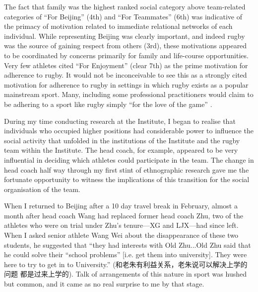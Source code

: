 \begin{CJK}{UTF8}{gbsn}
The fact that family was the highest ranked social category above team-related categories of ``For Beijing'' (4th) and ``For Teammates'' (6th) was indicative of the primacy of motivation related to immediate relational networks of each individual.  While representing Beijing was clearly important, and indeed rugby was the source of gaining respect from others (3rd), these motivations appeared to be coordinated by concerns primarily for family and life-course opportunities.  Very few athletes cited ``For Enjoyment'' (clear 7th) as the prime motivation for adherence to rugby.  It would not be inconceivable to see this as a strongly cited motivation for adherence to rugby in settings in which rugby exists as a popular mainstream sport.  Many, including some professional practitioners would claim to be adhering to a sport like rugby simply ``for the love of the game'' \citep{}.

During my time conducting research at the Institute, I began to realise that individuals who occupied higher positions had considerable power to influence the social activity that unfolded in the institutions of the Institute and the rugby team within the Institute.   The head coach, for example, appeared to be very influential in deciding which athletes could participate in the team.  The change in head coach half way through my first stint of ethnographic research gave me the fortunate opportunity to witness the implications of this transition for the social organisation of the team.

When I returned to Beijing after a 10 day travel break in February, almost a month after head coach Wang had replaced former head coach Zhu, two of the athletes who were on trial under Zhu's tenure---XG and LJX---had since left.  When I asked senior athlete Wang Wei about the disappearance of these two students, he suggested that ``they had interests with Old Zhu...Old Zhu said that he could solve their ``school problems'' [i.e. get them into university]. They were here to try to get in to University.'' (和老朱有利益关系，老朱说可以解决上学的问题 都是过来上学的). Talk of arrangements of this nature in sport was hushed but common, and it came as no real surprise to me by that stage.


\end{CJK}
